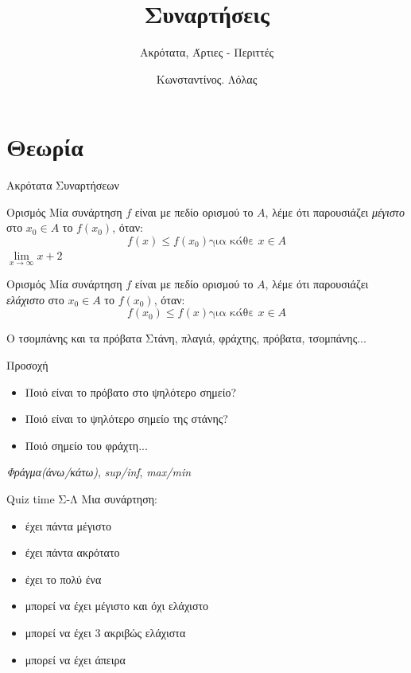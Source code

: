 \documentclass[greek]{beamer}
\title{Συναρτήσεις}
\subtitle{Ακρότατα, Άρτιες - Περιττές}
\author[Λόλας]{Κωνσταντίνος. Λόλας}
\date{}
\begin{document}
\begin{frame}
      \titlepage
\end{frame}

\section{Θεωρία}
\begin{frame}{Ακρότατα Συναρτήσεων}
      \begin{block}{Ορισμός}
            Μία συνάρτηση $f$ είναι με πεδίο ορισμού το $Α$, λέμε ότι παρουσιάζει \emph{μέγιστο} στο $x_0\in Α$ το $f(x_0)$, όταν:
            $$f(x)\le f(x_0)\text{για κάθε } x\in Α$$
            $\lim\limits_{x \to \infty}{ x+2 }$
      \end{block} \pause
      \begin{block}{Ορισμός}
            Μία συνάρτηση $f$ είναι με πεδίο ορισμού το $Α$, λέμε ότι παρουσιάζει \emph{ελάχιστο} στο $x_0\in Α$ το $f(x_0)$, όταν:
            $$f(x_0)\le f(x)\text{για κάθε } x\in Α$$
      \end{block}
\end{frame}

\begin{frame}{Ο τσομπάνης και τα πρόβατα}
      Στάνη, πλαγιά, φράχτης, πρόβατα, τσομπάνης... \pause
      \begin{alertblock}{Προσοχή}
            \begin{itemize}
                  \item Ποιό είναι το πρόβατο στο ψηλότερο σημείο?
                  \item Ποιό είναι το ψηλότερο σημείο της στάνης?
                  \item Ποιό σημείο του φράχτη...
            \end{itemize}
      \end{alertblock}
      \emph{Φράγμα(άνω/κάτω)}, \emph{sup/inf}, \emph{max/min}
\end{frame}

\begin{frame}{Quiz time Σ-Λ}
      Μια συνάρτηση:
      \begin{itemize}
            \item έχει πάντα μέγιστο\pause
            \item έχει πάντα ακρότατο\pause
            \item έχει το πολύ ένα \pause
            \item μπορεί να έχει μέγιστο και όχι ελάχιστο \pause
            \item μπορεί να έχει 3 ακριβώς ελάχιστα \pause
            \item μπορεί να έχει άπειρα
      \end{itemize}
\end{frame}
\end{document}
